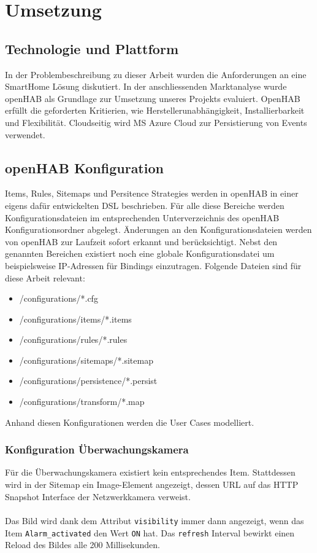 \section{Umsetzung}
\label{sec:chapterRealization}
\subsection{Technologie und Plattform}
In der Problembeschreibung zu dieser Arbeit wurden die Anforderungen an eine SmartHome Lösung diskutiert. In der anschliessenden Marktanalyse wurde openHAB als Grundlage zur Umsetzung unseres Projekts evaluiert. OpenHAB erfüllt die geforderten Kritierien, wie Herstellerunabhängigkeit, Installierbarkeit und Flexibilität. Cloudseitig wird MS Azure Cloud zur Persistierung von Events verwendet.


\subsection{openHAB Konfiguration}
Items, Rules, Sitemaps und Persitence Strategies werden in openHAB in einer eigens dafür entwickelten DSL beschrieben. Für alle diese Bereiche werden Konfigurationsdateien im entsprechenden Unterverzeichnis des openHAB Konfigurationsordner abgelegt. Änderungen an den Konfigurationsdateien werden von openHAB zur Laufzeit sofort erkannt und berücksichtigt. Nebst den genannten Bereichen existiert noch eine globale Konfigurationsdatei um beispielsweise IP-Adressen für Bindings einzutragen. Folgende Dateien sind für diese Arbeit relevant:

\begin{itemize}
	\item /configurations/*.cfg
	\item /configurations/items/*.items
	\item /configurations/rules/*.rules
	\item /configurations/sitemaps/*.sitemap
	\item /configurations/persistence/*.persist
	\item /configurations/transform/*.map
\end{itemize}

Anhand diesen Konfigurationen werden die User Cases modelliert.

\subsubsection{Konfiguration Überwachungskamera} 
Für die Überwachungskamera existiert kein entsprechendes Item. Stattdessen wird in der Sitemap ein Image-Element angezeigt, dessen URL auf das HTTP Snapshot Interface der Netzwerkkamera verweist.\\ \\
Das Bild wird dank dem Attribut \lstinline!visibility!  immer dann angezeigt, wenn das Item \lstinline!Alarm_activated! den Wert \lstinline!ON! hat. Das \lstinline!refresh! Interval bewirkt einen Reload des Bildes alle 200 Millisekunden.

